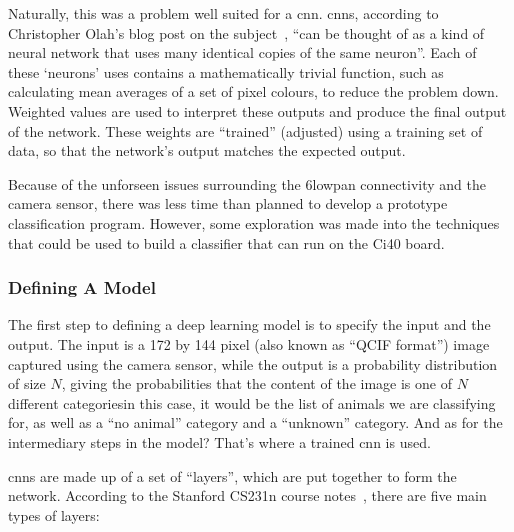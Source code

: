 Naturally, this was a problem well suited for a \acrfull{cnn}.
\acrshort{cnn}s, according to Christopher Olah's blog post on the
subject~\cite{olah2014conv}, ``can be thought of as a kind of neural network
that uses many identical copies of the same neuron''. Each of these `neurons'
uses contains a mathematically trivial function, such as calculating mean
averages of a set of pixel colours, to reduce the problem down. Weighted
values are used to interpret these outputs and produce the final output of
the network. These weights are ``trained'' (adjusted) using a training set of
data, so that the network's output matches the expected output.

Because of the unforseen issues surrounding the \gls{6lowpan} connectivity
and the camera sensor, there was less time than planned to develop a
prototype classification program. However, some exploration was made into the
techniques that could be used to build a classifier that can run on the Ci40
board.

\subsubsection{Defining A Model}
The first step to defining a deep learning model is to specify the input and
the output. The input is a 172 by 144 pixel (also known as ``QCIF format'')
image captured using the camera sensor, while the output is a probability
distribution of size $N$, giving the probabilities that the content of the
image is one of $N$ different categories\textemdash{}in this case, it would
be the list of animals we are classifying for, as well as a ``no animal''
category and a ``unknown'' category. And as for the intermediary steps in the
model? That's where a trained \acrlong{cnn} is used.

\acrshort{cnn}s are made up of a set of ``layers'', which are put together to
form the network. According to the Stanford CS231n course
notes~\cite{cs321n-cnn}, there are five main types of layers:

